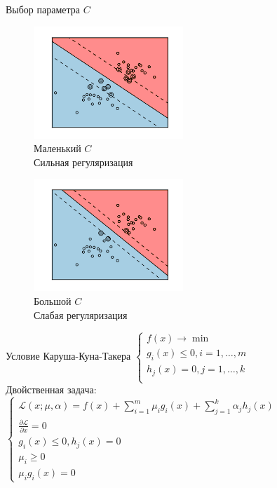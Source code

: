 \documentclass[12pt]{beamer}
\begin{document}
{
\begin{frame}{Выбор параметра $C$}
	\begin{figure}[htbp]
		\begin{minipage}{.5\textwidth}
		  \includegraphics[height=120pt, keepaspectratio = true]{images/svm_reg} \\
			\centering Маленький $C$\\ Сильная регуляризация\\
	  \end{minipage}%
	  \begin{minipage}{.5\textwidth}
			\includegraphics[height=120pt, keepaspectratio = true]{images/svm_non_reg}   \\
		  \centering Большой $C$\\ Слабая регуляризация\\
		\end{minipage}%
	\end{figure}
\end{frame}
}

\begin{frame}{Условие Каруша-Куна-Такера}
	$\begin{cases}
		f(x) \rightarrow \min\\
		g_i(x) \leq 0 , i = 1, \dots, m\\
		h_j(x) = 0 , j = 1, \dots, k\\
	\end{cases}$\\
	\bigbreak
	\pause
	Двойственная задача:\\
	$\begin{cases}
		\mathcal{L}(x; \mu, \alpha) = f(x) + \sum\limits_{i = 1}^m \mu_ig_i(x) + \sum\limits_{j = 1}^k \alpha_jh_j(x)\\
		\frac{\partial \mathcal{L}}{\partial x} = 0\\
		g_i(x) \leq 0 , h_j(x) = 0\\
		\mu_i \geq 0\\
		\mu_ig_i(x) = 0
	\end{cases}$\\
\end{frame}
\end{document}
